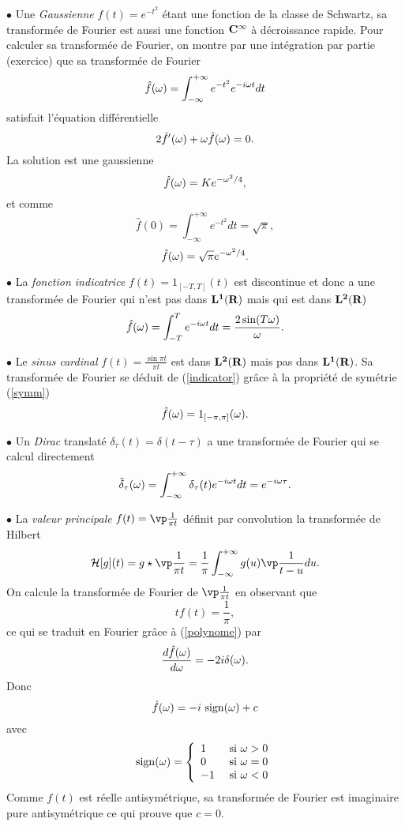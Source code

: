 $\bullet$ Une 
{\it Gaussienne} $f(t) = e^{- t^2}$ \'etant une fonction
de la classe de Schwartz, sa transform\'ee de Fourier est
aussi une fonction ${\bf C}^\infty$ \`a d\'ecroissance rapide.
Pour calculer sa transform\'ee de Fourier,
on montre par une int\'egration par partie (exercice)
que sa transform\'ee de Fourier
\[
\hat f({\omega}) = \int_{-\infty}^{+\infty} e^{-t^2} e^{-i {\omega} t} dt 
\]
satisfait l'\'equation diff\'erentielle
\[
2 \hat f '({\omega}) + {\omega} \hat f ({\omega}) = 0.
\]
La solution est une gaussienne
\[
\hat f({\omega}) = K e^{-{\omega}^2/4} ,
\]
et comme
\[
\hat f(0) = \int_{-\infty}^{+\infty} e^{-t^2} dt = \sqrt \pi ,
\]
\begin{equation}
\label{gaussian-fourier}
\hat f({\omega}) = \sqrt \pi e^{-{\omega}^2/4} .
\end{equation}

$\bullet$ La 
{\it fonction indicatrice}
$f(t) = 1_{[-T,T]} (t)$ est discontinue et donc a une
transform\'ee de Fourier qui n'est pas dans ${\bf L ^ 1 ({\bf{R}})}$ mais qui
est dans ${\bf L ^ 2 ({\bf{R}})}$
\begin{equation}
\label{indicator}
\hat f ({\omega}) =  \int_{-T}^{T} e^{-i {\omega} t} dt = \frac {2 \sin (T {\omega})} { {\omega}} .
\end{equation}

$\bullet$ 
Le 
{\it sinus cardinal} $f(t) = \frac{ \sin \pi t} {\pi t}$ est dans ${\bf L ^ 2 ({\bf{R}})}$ mais pas
dans ${\bf L ^ 1 ({\bf{R}})}$. Sa transform\'ee de Fourier se 
d\'eduit de (\ref{indicator}) gr\^ace \`a la propri\'et\'e de sym\'etrie 
(\ref{symm})
\begin{equation}
\label{fourier-sinc}
\hat f({\omega}) = 1_{[-\pi,\pi]}({\omega}) .
\end{equation}

$\bullet$ Un {\it Dirac} translat\'e
$\delta_\tau (t) = \delta (t-\tau)$ a une
transform\'ee de Fourier qui se calcul directement
\begin{equation}
\label{dirac_transl}
\hat \delta_\tau ({\omega}) = 
\int_{-\infty}^{+\infty} \delta_\tau (t) e^{-i{\omega} t} dt = 
e^{-i{\omega} \tau} .
\end{equation}

$\bullet$ La {\it valeur principale} $f(t) = \vp \frac 1 {\pi t}$
d\'efinit par convolution la transform\'ee de Hilbert 
\begin{equation} 
{\cal H}[ g] (t) = g \star \vp \frac 1 {\pi t } = 
\frac 1 \pi \int_{- \infty}^{+ \infty} 
{g( u )} \vp \frac 1 {t - u} d u .
\end{equation} 
On calcule la transform\'ee de 
Fourier de $\vp \frac 1 {\pi t}$
en observant que
\[
t f(t) = \frac 1 \pi ,
\]
ce qui se traduit en Fourier gr\^ace \`a
(\ref{polynome}) par
\[
\frac {d \hat f ({\omega})} {d {\omega}} = -2i \delta ({\omega}) .
\]
Donc 
\begin{equation}
\label{hilbert_fourier}
\hat f ({\omega}) = -i ~ {\rm sign} ({\omega}) + c
\end{equation}
avec
\[
{\rm sign}({\omega}) = 
\left\{
\begin{array} {ll}
1 & \mbox{ si ${\omega} > 0$}\\
0 & \mbox{ si ${\omega} = 0$}\\
-1 & \mbox{ si ${\omega} < 0$}
\end{array}
\right.
\]
Comme $f(t)$ est r\'eelle antisym\'etrique, sa transform\'ee
de Fourier est imaginaire pure antisym\'etrique ce qui
prouve que $c = 0$.

